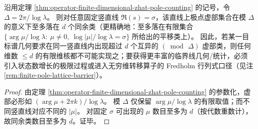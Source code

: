 \begin{corollary}\label{cor:operator-phase-comb-congruence-classes}
沿用定理 \ref{thm:operator-finite-dimensional-zhat-pole-counting} 的记号，令 \(\Delta=2\pi/\log\lambda\)。
则对任意固定竖直线 \(\Re(s)=\sigma\)，该直线上极点虚部集合在模 \(\Delta\) 的意义下至多落在 \(d\) 个同余类（更精确地：至多落在有限集合 \(\{\arg\mu/\log\lambda:\ \mu\neq 0,\ \log|\mu|/\log\lambda=\sigma\}\) 所给出的平移类上）。
因此，若某一目标谱几何要求在同一竖直线内出现超过 \(d\) 个互异的 \((\bmod\,\Delta)\) 虚部类，则任何维数 \(\le d\) 的有限维核都不可能实现之；要获得更丰富的临界线几何/统计，必须引入状态数增长的极限过程或进入无穷维转移算子的 Fredholm 行列式口径（见注 \ref{rem:finite-pole-lattice-barrier}）。
\end{corollary}
\begin{proof}
由定理 \ref{thm:operator-finite-dimensional-zhat-pole-counting} 的参数化，虚部必形如 \((\arg\mu+2\pi k)/\log\lambda\)。
模 \(\Delta\) 仅保留 \(\arg\mu/\log\lambda\) 的有限取值；而不同竖直线对应不同的 \(|\mu|\)。
对固定 \(\sigma\) 可出现的 \(\mu\) 数目至多为 \(d\)（按代数重数计），故同余类数目至多为 \(d\)。证毕。
\end{proof}

